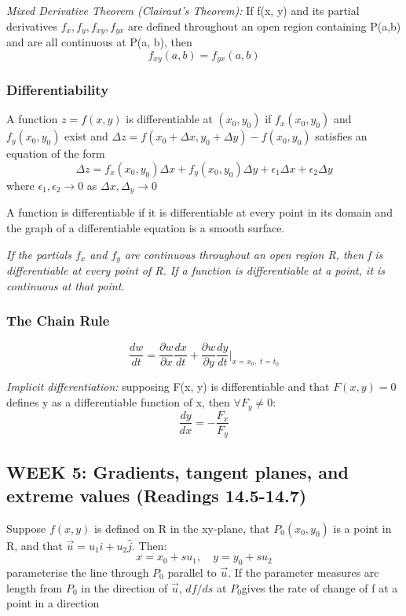 \documentclass[12pt]{article}
\begin{document}
\emph{Mixed Derivative Theorem (Clairaut's Theorem):}
If f(x, y) and its partial derivatives $f_x, f_y, f_{xy}, f_{yx}$ are defined throughout an open region containing P(a,b) and are all continuous at P(a, b), then 
\[f_{xy} (a, b) = f_{yx} (a, b)\]

\subsubsection{Differentiability}
A function $z = f(x, y)$ is differentiable at $(x_0, y_0)$ if $f_x (x_0, y_0)$ and $f_y (x_0, y_0)$ exist and $\Delta z = f(x_0 + \Delta x, y_0 + \Delta y) - f(x_0, y_0)$ satisfies an equation of the form 
\[\Delta z = f_x (x_0, y_0) \Delta x + f_y (x_0, y_0) \Delta y + \epsilon_1 \Delta x + \epsilon_2 \Delta y\]
where $\epsilon_1, \epsilon_2 \to 0$ as $\Delta x, \Delta_y \to 0$

A function is differentiable if it is differentiable at every point in its domain and the graph of a differentiable equation is a smooth surface.

\emph{If the partials $f_x$ and $f_y$ are continuous throughout an open region R, then f is differentiable at every point of R. If a function is differentiable at a point, it is continuous at that point.}

\subsubsection{The Chain Rule}
\[\frac{dw}{dt} = \frac{\partial w}{\partial x} \frac{dx}{dt} + \frac{\partial w}{\partial y}\frac{dy}{dt} \bigg|_{x= x_0,\; t=t_0}\]

\emph{Implicit differentiation:} supposing F(x, y) is differentiable and that $F(x, y) = 0$ defines y as a differentiable function of x, then $\forall F_y \neq 0$:
\[ \frac{dy}{dx} = -\frac{F_x}{F_y}\]
\subsection{WEEK 5: Gradients, tangent planes, and extreme values (Readings 14.5-14.7)}
Suppose $f(x,y)$ is defined on R in the xy-plane, that $P_0(x_0, y_0)$ is a point in R, and that $\vec{u} = u_1 \hat{i} + u_2 \hat{j}$. Then:
\[ x = x_0 + su_1, \quad y = y_0 + su_2\]
parameterise the line through $P_0$ parallel to $\vec{u}$. If the parameter measures arc length from $P_0$ in the direction of $\vec{u}$, $df/ds$ at $P_0$gives the rate of change of f at a point in a direction
\end{document}

